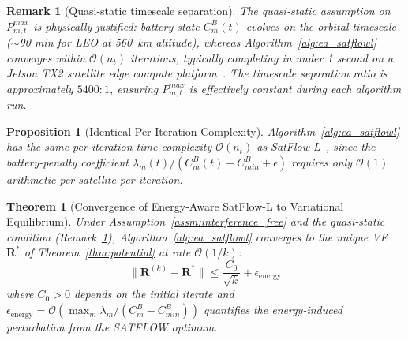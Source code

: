 \documentclass[journal]{IEEEtran}
\newtheorem{theorem}{Theorem}
\newtheorem{proposition}{Proposition}
\newtheorem{remark}{Remark}
\newcommand{\CB}{C^{B}}
\newcommand{\CBmin}{C^{B}_{min}}
\newcommand{\bfR}{\mathbf{R}}
\begin{document}
\begin{remark}[Quasi-static timescale separation]
\label{rem:timescale}
The quasi-static assumption on $P_{m,t}^{max}$ is physically justified: battery state $\CB_m(t)$ evolves on the orbital timescale ($\sim$90 min for LEO at 560~km altitude), whereas Algorithm~\ref{alg:ea_satflowl} converges within $\mathcal{O}(n_t)$ iterations, typically completing in under 1 second on a Jetson TX2 satellite edge compute platform~\cite{cen2024satflow}. The timescale separation ratio is approximately $5400:1$, ensuring $P_{m,t}^{max}$ is effectively constant during each algorithm run.
\end{remark}

\begin{proposition}[Identical Per-Iteration Complexity]
\label{prop:complexity}
Algorithm~\ref{alg:ea_satflowl} has the same per-iteration time complexity $\mathcal{O}(n_t)$ as SatFlow-L~\cite{cen2024satflow}, since the battery-penalty coefficient $\lambda_m(t)/(\CB_m(t)-\CBmin+\epsilon)$ requires only $\mathcal{O}(1)$ arithmetic per satellite per iteration.
\end{proposition}

\begin{theorem}[Convergence of Energy-Aware SatFlow-L
to Variational Equilibrium]
\label{thm:convergence}
Under Assumption~\ref{assm:interference_free} and the quasi-static condition (Remark~\ref{rem:timescale}), Algorithm~\ref{alg:ea_satflowl} converges to the unique VE $\bfR^*$ of Theorem~\ref{thm:potential} at rate $\mathcal{O}(1/k)$:
\begin{equation}
    \|\bfR^{(k)} - \bfR^*\|
    \leq \frac{C_0}{\sqrt{k}}
    + \epsilon_{\mathrm{energy}}
    \label{eq:convergence_rate}
\end{equation}
where $C_0>0$ depends on the initial iterate and $\epsilon_{\mathrm{energy}} = \mathcal{O}(\max_m
\lambda_m/(\CB_m-\CBmin))$
quantifies the energy-induced perturbation from the SATFLOW optimum.
\end{theorem}
\end{document}
